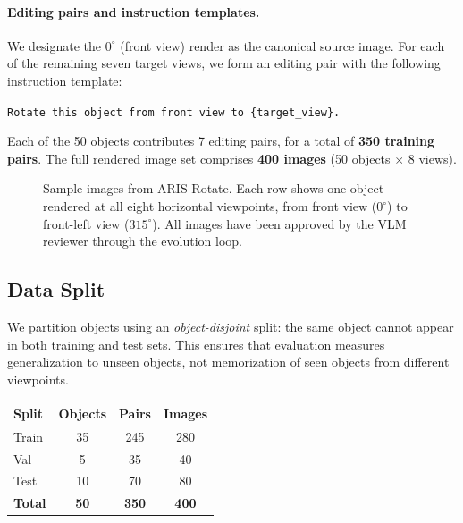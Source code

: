 \paragraph{Editing pairs and instruction templates.}
We designate the $0^\circ$ (front view) render as the canonical source image.
For each of the remaining seven target views,
we form an editing pair with the following instruction template:

\begin{center}
\texttt{Rotate this object from front view to \{target\_view\}.}
\end{center}

Each of the 50 objects contributes 7 editing pairs,
for a total of \textbf{350 training pairs}.
The full rendered image set comprises \textbf{400 images} (50 objects $\times$ 8 views).

\begin{figure}[t]
  \centering
  \caption{
    Sample images from ARIS-Rotate.
    Each row shows one object rendered at all eight horizontal viewpoints,
    from front view ($0^\circ$) to front-left view ($315^\circ$).
    All images have been approved by the VLM reviewer through the evolution loop.
  }
  \label{fig:dataset_grid}
\end{figure}

\subsection{Data Split}
\label{sec:dataset:split}

We partition objects using an \emph{object-disjoint} split:
the same object cannot appear in both training and test sets.
This ensures that evaluation measures generalization to unseen objects,
not memorization of seen objects from different viewpoints.

\begin{center}
\begin{tabular}{lccc}
\toprule
Split & Objects & Pairs & Images \\
\midrule
Train & 35 & 245 & 280 \\
Val   & 5  & 35  & 40  \\
Test  & 10 & 70  & 80  \\
\midrule
\textbf{Total} & \textbf{50} & \textbf{350} & \textbf{400} \\
\bottomrule
\end{tabular}
\end{center}

